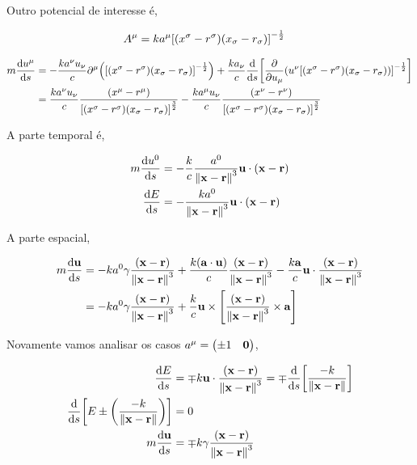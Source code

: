 \documentclass[twoside]{amsart}
\numberwithin{equation}{section}
\begin{document}
Outro potencial de interesse é,

\begin{align}
    A^\mu&=ka^\mu\qty[\qty(x^\sigma-r^\sigma)\qty(x_\sigma-r_\sigma)]^{-\frac12}
\end{align}

\begin{align}
    m\dv{u^\mu}{s}&=-\frac {ka^\nu u_\nu}{c}\partial^\mu\qty(\qty[\qty(x^\sigma-r^\sigma)\qty(x_\sigma -r_\sigma)]^{-\frac12})+\frac{ka_\nu}{c}\dv{}{s}\qty[\pdv{}{u_\mu}\qty(u^\nu \qty[\qty(x^\sigma-r^\sigma)\qty(x_\sigma-r_\sigma))]^{-\frac12}]\\
    &=\frac{ka^\nu u_\nu}{c}\frac{\qty(x^\mu-r^\mu)}{\qty[\qty(x^\sigma-r^\sigma)\qty(x_\sigma -r_\sigma)]^{\frac32}}-\frac{ka^\mu u_\nu}{c}\frac{\qty(x^\nu-r^\nu)}{\qty[\qty(x^\sigma-r^\sigma)\qty(x_\sigma -r_\sigma)]^{\frac32}}
\end{align}

A parte temporal é,

\begin{align}
    m\dv{u^0}{s}&=-\frac{k}{c}\frac{a^0}{\norm{\vb x-\vb r}^3}\vb u\cdot \qty(\vb x-\vb r)\\
    \dv{E}{s}&=-\frac{ka^0}{\norm{\vb x-\vb r}^3}\vb u\cdot \qty(\vb x-\vb r)
\end{align}

A parte espacial,

\begin{align}
    m\dv{\vb u}{s}&=-ka^0 \gamma\frac{\qty(\vb x-\vb r)}{\norm{\vb x-\vb r}^{3}}+\frac{k\qty(\vb a\cdot \vb u)}{c}\frac{\qty(\vb x-\vb r)}{\norm{\vb x-\vb r}^{3}}-\frac{k\vb a}{c}\vb u \cdot \frac{\qty(\vb x-\vb r)}{\norm{\vb x-\vb r}^{3}}\\
    &=-ka^0\gamma\frac{\qty(\vb x-\vb r)}{\norm{\vb x-\vb r}^{3}}+\frac kc\vb u\times\qty[\frac{\qty(\vb x-\vb r)}{\norm{\vb x-\vb r}^3}\times \vb a]
\end{align}

Novamente vamos analisar os casos $a^\mu=\mqty(\pm1&\vb 0)$,

\begin{align}
    \dv{E}{s}&=\mp k\vb u\cdot\frac{\qty(\vb x-\vb r)}{\norm{\vb x-\vb r}^3}=\mp \dv{}{s}\qty[\frac{-k}{\norm{\vb x-\vb r}}] \\
    \dv{}{s}\qty[E\pm \qty(\frac{-k}{\norm{\vb x-\vb r}})]&=0\\
    m\dv{\vb u}{s}&=\mp k \gamma\frac{\qty(\vb x-\vb r)}{\norm{\vb x-\vb r}^{3}}
\end{align}
\end{document}
